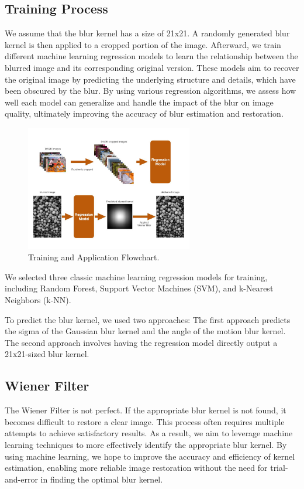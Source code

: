 \documentclass[twoside,11pt]{article}
\begin{document}
\subsection{Training Process}
We assume that the blur kernel has a size of 21x21. A randomly generated blur kernel is then applied to a cropped portion of the image. Afterward, we train different machine learning regression models to learn the relationship between the blurred image and its corresponding original version. These models aim to recover the original image by predicting the underlying structure and details, which have been obscured by the blur. By using various regression algorithms, we assess how well each model can generalize and handle the impact of the blur on image quality, ultimately improving the accuracy of blur estimation and restoration.

\begin{figure}[H]
\centering
\includegraphics[width=0.65\textwidth]{figure6.jpg}
\caption{Training and Application Flowchart.}
\end{figure}

We selected three classic machine learning regression models for training, including Random Forest, Support Vector Machines (SVM), and k-Nearest Neighbors (k-NN).

To predict the blur kernel, we used two approaches: The first approach predicts the sigma of the Gaussian blur kernel and the angle of the motion blur kernel. The second approach involves having the regression model directly output a 21x21-sized blur kernel.

\subsection{Wiener Filter}
The Wiener Filter is not perfect. If the appropriate blur kernel is not found, it becomes difficult to restore a clear image. This process often requires multiple attempts to achieve satisfactory results. As a result, we aim to leverage machine learning techniques to more effectively identify the appropriate blur kernel. By using machine learning, we hope to improve the accuracy and efficiency of kernel estimation, enabling more reliable image restoration without the need for trial-and-error in finding the optimal blur kernel.
\end{document}
